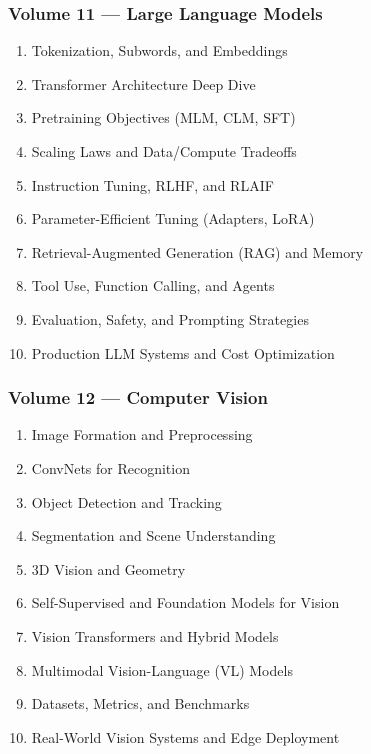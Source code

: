 \documentclass[
  letterpaper,
  DIV=11,
  numbers=noendperiod]{scrreprt}
\providecommand{\tightlist}{%
  \setlength{\itemsep}{0pt}\setlength{\parskip}{0pt}}
\begin{document}
\subsubsection{Volume 11 --- Large Language
Models}\label{volume-11-large-language-models}

\begin{enumerate}
\def\labelenumi{\arabic{enumi}.}
\setcounter{enumi}{100}
\tightlist
\item
  Tokenization, Subwords, and Embeddings
\item
  Transformer Architecture Deep Dive
\item
  Pretraining Objectives (MLM, CLM, SFT)
\item
  Scaling Laws and Data/Compute Tradeoffs
\item
  Instruction Tuning, RLHF, and RLAIF
\item
  Parameter-Efficient Tuning (Adapters, LoRA)
\item
  Retrieval-Augmented Generation (RAG) and Memory
\item
  Tool Use, Function Calling, and Agents
\item
  Evaluation, Safety, and Prompting Strategies
\item
  Production LLM Systems and Cost Optimization
\end{enumerate}

\subsubsection{Volume 12 --- Computer
Vision}\label{volume-12-computer-vision}

\begin{enumerate}
\def\labelenumi{\arabic{enumi}.}
\setcounter{enumi}{110}
\tightlist
\item
  Image Formation and Preprocessing
\item
  ConvNets for Recognition
\item
  Object Detection and Tracking
\item
  Segmentation and Scene Understanding
\item
  3D Vision and Geometry
\item
  Self-Supervised and Foundation Models for Vision
\item
  Vision Transformers and Hybrid Models
\item
  Multimodal Vision-Language (VL) Models
\item
  Datasets, Metrics, and Benchmarks
\item
  Real-World Vision Systems and Edge Deployment
\end{enumerate}
\end{document}
